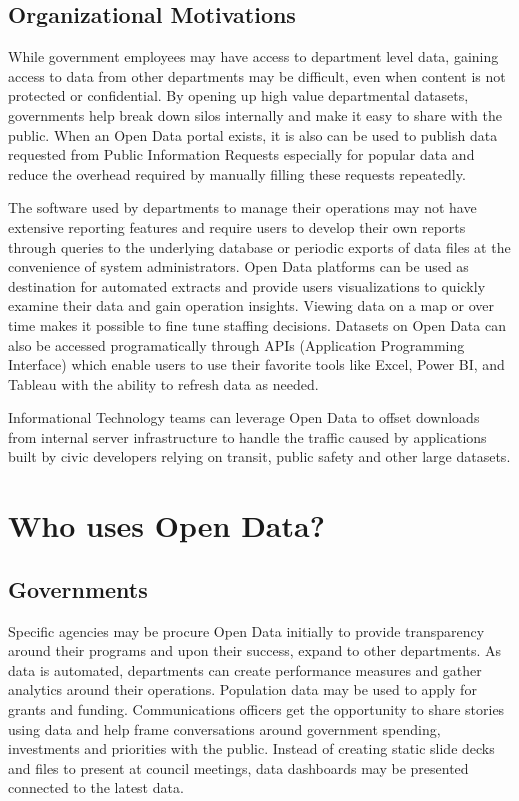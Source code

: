 \documentclass[
  openany]{book}
\begin{document}
\hypertarget{organizational-motivations}{%
\subsection{Organizational Motivations}\label{organizational-motivations}}

While government employees may have access to department level data, gaining access to data from other departments may be difficult, even when content is not protected or confidential. By opening up high value departmental datasets, governments help break down silos internally and make it easy to share with the public. When an Open Data portal exists, it is also can be used to publish data requested from Public Information Requests especially for popular data and reduce the overhead required by manually filling these requests repeatedly.

The software used by departments to manage their operations may not have extensive reporting features and require users to develop their own reports through queries to the underlying database or periodic exports of data files at the convenience of system administrators. Open Data platforms can be used as destination for automated extracts and provide users visualizations to quickly examine their data and gain operation insights. Viewing data on a map or over time makes it possible to fine tune staffing decisions. Datasets on Open Data can also be accessed programatically through APIs (Application Programming Interface) which enable users to use their favorite tools like Excel, Power BI, and Tableau with the ability to refresh data as needed.

Informational Technology teams can leverage Open Data to offset downloads from internal server infrastructure to handle the traffic caused by applications built by civic developers relying on transit, public safety and other large datasets.

\hypertarget{who-uses-open-data}{%
\section{Who uses Open Data?}\label{who-uses-open-data}}

\hypertarget{governments}{%
\subsection{Governments}\label{governments}}

Specific agencies may be procure Open Data initially to provide transparency around their programs and upon their success, expand to other departments. As data is automated, departments can create performance measures and gather analytics around their operations. Population data may be used to apply for grants and funding. Communications officers get the opportunity to share stories using data and help frame conversations around government spending, investments and priorities with the public. Instead of creating static slide decks and files to present at council meetings, data dashboards may be presented connected to the latest data.
\end{document}

